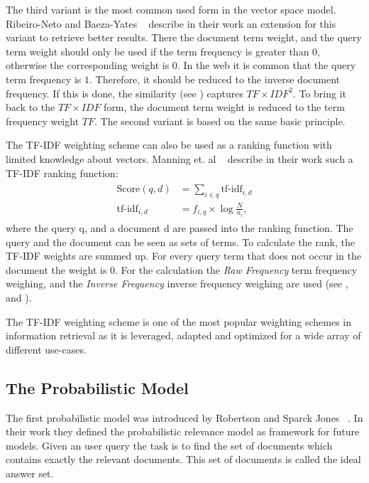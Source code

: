 The third variant is the most common used form in the vector space model. Ribeiro-Neto and Baeza-Yates ~\cite{ModernInvormationRetrieval1999} describe in their work an extension for this variant to retrieve better results. There the document term weight, and the query term weight should only be used if the term frequency is greater than $0$, otherwise the corresponding weight is $0$. In the web it is common that the query term frequency is $1$. Therefore, it should be reduced to the inverse document frequency. If this is done, the similarity (see ) captures $TF \times IDF^2$. To bring it back to the $TF \times IDF$ form, the document term weight is reduced to the term frequency weight $TF$. The second variant is based on the same basic principle.

The TF-IDF weighting scheme can also be used as a ranking function with limited knowledge about vectors. Manning et. al ~\cite{manning2008} describe in their work such a TF-IDF ranking function:
\begin{align}
  \begin{split}
    \text{Score}(q, d) & = \sum_{i \in q} \text{tf-idf}_{i, d} \\
    \text{tf-idf}_{i, d} & = f_{i, q} \times \log \frac{N}{n_i},
  \end{split}
\end{align}
where the query q, and a document d are passed into the ranking function. The query and the document can be seen as sets of terms. To calculate the rank, the TF-IDF weights are summed up. For every query term that does not occur in the document the weight is $0$. For the calculation the \textit{Raw Frequency} term frequency weighing, and the \textit{Inverse Frequency} inverse frequency weighing are used (see , and ).

The TF-IDF weighting scheme is one of the most popular weighting schemes in information retrieval as it is leveraged, adapted and optimized for a wide array of different use-cases.

\subsection{The Probabilistic Model}
\label{sec:the_probabilistic_model}

The first probabilistic model was introduced by Robertson and Sparck Jones ~\cite{Robertson1976}. In their work they defined the probabilistic relevance model as framework for future models. Given an user query the task is to find the set of documents which contains exactly the relevant documents. This set of documents is called the ideal answer set. 

